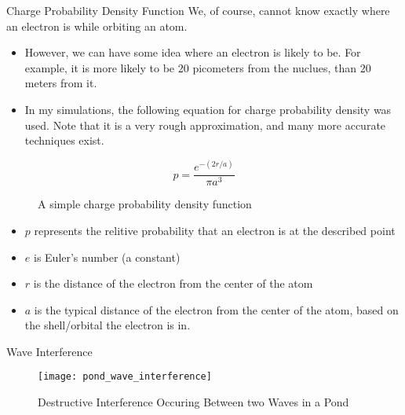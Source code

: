 \documentclass[aspectratio=169]{beamer}
\begin{document}
\begin{frame}[t]{Charge Probability Density Function}
	We, of course, cannot know exactly where an electron is while orbiting an atom.
	
	\begin{itemize}
		\item However, we can have some idea where an electron is likely to be. For example, it is more likely to be 20 picometers from the nuclues, than 20 meters from it.
		\item In my simulations, the following equation for charge probability density was used. Note that it is a very rough approximation, and many more accurate techniques exist.
	\end{itemize}
	
	\begin{figure}
		$$ p = \frac{e^{-(2r/a)}}{\pi a^3}$$
		\caption{A simple charge probability density function}
	\end{figure}
	
	\begin{center}
	
	\begin{scriptsize}
	
	\begin{itemize}
	
	\item $p$ represents the relitive probability that an electron is at the described point
	
	\item $e$ is Euler's number (a constant)
	
	\item $r$ is the distance of the electron from the center of the atom
	
	\item $a$ is the typical distance of the electron from the center of the atom, based on the shell/orbital the electron is in.
	
	\end{itemize}
	
	\end{scriptsize}
	
	\end{center}

\end{frame}
				
				
\begin{frame}{Wave Interference}
	\begin{figure}
		\texttt{[image: pond\_wave\_interference]}
												
		\caption {Destructive Interference Occuring Between two Waves in a Pond}
	\end{figure}
							
\end{frame}
				
\end{document}
